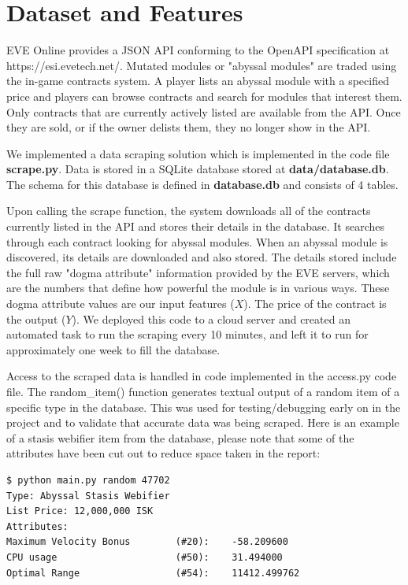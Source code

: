 \documentclass[10pt]{article}
\begin{document}
\section{Dataset and Features}
	EVE Online provides a JSON API conforming to the OpenAPI specification at https://esi.evetech.net/. Mutated modules or "abyssal modules" are traded using the in-game contracts system. A player lists an abyssal module with a specified price and players can browse contracts and search for modules that interest them. Only contracts that are currently actively listed are available from the API. Once they are sold, or if the owner delists them, they no longer show in the API.
	
	We implemented a data scraping solution which is implemented in the code file \textbf{scrape.py}. Data is stored in a SQLite database stored at \textbf{data/database.db}. The schema for this database is defined in \textbf{database.db} and consists of 4 tables. 
	
	Upon calling the scrape function, the system downloads all of the contracts currently listed in the API and stores their details in the database. It searches through each contract looking for abyssal modules. When an abyssal module is discovered, its details are downloaded and also stored. The details stored include the full raw "dogma attribute" information provided by the EVE servers, which are the numbers that define how powerful the module is in various ways. These dogma attribute values are our input features ($X$). The price of the contract is the output ($Y$). We deployed this code to a cloud server and created an automated task to run the scraping every 10 minutes, and left it to run for approximately one week to fill the database.
	
	Access to the scraped data is handled in code implemented in the access.py code file. The random\_item() function generates textual output of a random item of a specific type in the database. This was used for testing/debugging early on in the project and to validate that accurate data was being scraped. Here is an example of a stasis webifier item from the database, please note that some of the attributes have been cut out to reduce space taken in the report:
	
	\begin{lstlisting}
$ python main.py random 47702
Type: Abyssal Stasis Webifier
List Price: 12,000,000 ISK
Attributes:
Maximum Velocity Bonus        (#20):    -58.209600
CPU usage                     (#50):    31.494000
Optimal Range                 (#54):    11412.499762
	\end{lstlisting}
\end{document}
